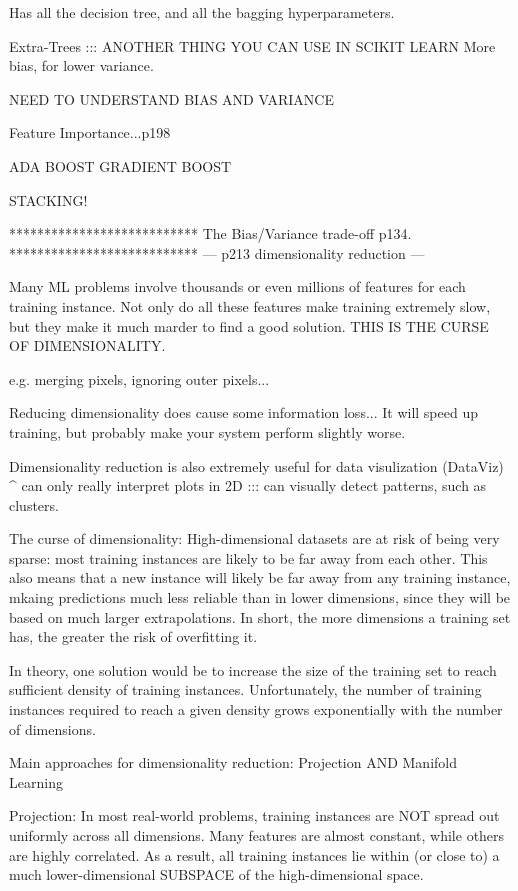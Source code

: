 Has all the decision tree, and all the bagging hyperparameters.

Extra-Trees ::: ANOTHER THING YOU CAN USE IN SCIKIT LEARN
More bias, for lower variance.

NEED TO UNDERSTAND BIAS AND VARIANCE

Feature Importance...p198

ADA BOOST
GRADIENT BOOST

STACKING!

***************************
The Bias/Variance trade-off
p134.
***************************
---
p213 dimensionality reduction
---

Many ML problems involve thousands or even millions of features for each training instance.
Not only do all these features make training extremely slow,
but they make it much marder to find a good solution.
THIS IS THE CURSE OF DIMENSIONALITY.

e.g. merging pixels, ignoring outer pixels...

Reducing dimensionality does cause some information loss...
It will speed up training, but probably make your system perform slightly worse.

Dimensionality reduction is also extremely useful for data visulization (DataViz)
^ can only really interpret plots in 2D ::: can visually detect patterns, such as clusters.


The curse of dimensionality:
High-dimensional datasets are at risk of being very sparse:
most training instances are likely to be far away from each other.
This also means that a new instance will likely be far away from any training instance,
mkaing predictions much less reliable than in lower dimensions,
since they will be based on much larger extrapolations.
In short, the more dimensions a training set has,
the greater the risk of overfitting it.

In theory,
one solution would be to increase the size of the training set to reach sufficient density of training instances.
Unfortunately,
the number of training instances required to reach a given density grows exponentially with the number of dimensions.

Main approaches for dimensionality reduction:
Projection AND Manifold Learning

Projection:
In most real-world problems,
training instances are NOT spread out uniformly across all dimensions.
Many features are almost constant,
while others are highly correlated.
As a result, all training instances lie within (or close to)
a much lower-dimensional SUBSPACE of the high-dimensional space.

